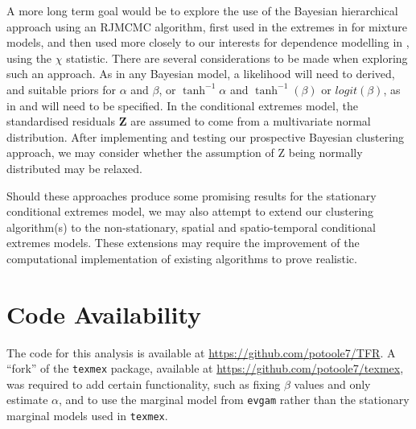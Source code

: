 \documentclass{article}
\numberwithin{equation}{section}
\begin{document}
A more long term goal would be to explore the use of the Bayesian hierarchical approach using an RJMCMC algorithm, first used in the extremes in \citet{Bottolo2003} for mixture models, and then used more closely to our interests for dependence modelling in \citet{Rohrbeck2021}, using the $\chi$ statistic.
There are several considerations to be made when exploring such an approach. 
As in any Bayesian model, a likelihood will need to derived, and suitable priors for $\alpha$ and $\beta$, or $\tanh^{-1}{\alpha}$ and $\tanh^{-1}(\beta)$ or $logit(\beta)$, as in \citet{Winter2016} and \cite{Richards2023} will need to be specified. 
In the conditional extremes model, the standardised residuals $\bm{Z}$ are assumed to come from a multivariate normal distribution. 
After implementing and testing our prospective Bayesian clustering approach, we may consider whether the assumption of Z being normally distributed may be relaxed.

Should these approaches produce some promising results for the stationary conditional extremes model, we may also attempt to extend our clustering algorithm(s) to the non-stationary, spatial and spatio-temporal conditional extremes models.
These extensions may require the improvement of the computational implementation of existing algorithms to prove realistic.

\section*{Code Availability}

The code for this analysis is available at \url{https://github.com/potoole7/TFR}.
A ``fork'' of the \texttt{texmex} package, available at \url{https://github.com/potoole7/texmex}, was required to add certain functionality, such as fixing $\beta$ values and only estimate $\alpha$, and to use the marginal model from \texttt{evgam} rather than the stationary marginal models used in \texttt{texmex}.


\newpage

\end{document}
